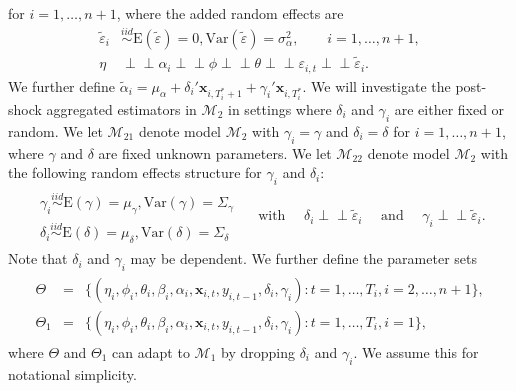 \documentclass[11pt]{article}
\def\mbf#1{\mathbf{#1}} %
\newcommand{\simiid}{\stackrel{iid}{\sim}} %
\newcommand{\indep}{\perp \!\!\! \perp } %
\def\mrm#1{\mathrm{#1}} %
\def\t#1{\tilde{#1}} %
\def\mc#1{\mathcal{#1}} %
\def\E#1{\mathrm{E}(#1)} %
\def\var#1{\mathrm{Var}(#1)} %
\theoremstyle{definition}
\begin{document}
for $i = 1, \ldots, n+1$, where the added random effects are
\begin{align*}
\t{\varepsilon}_{i} &\simiid  \E{\t{\varepsilon}}=0, \var{\t{\varepsilon}}=\sigma^2_{\alpha}, \qquad i = 1, \ldots, n+1,\\
\eta &\indep  \alpha_i \indep \phi \indep \theta \indep \varepsilon_{i,t} \indep \t{\varepsilon}_{i}.
\end{align*}
We further define 
$\tilde{\alpha}_i=\mu_{\alpha}+\delta_i'\mbf{x}_{i, T_i^*+1}+\gamma_i'\mbf{x}_{i, T_i^*}$. 
We will investigate the post-shock aggregated estimators in $\mc{M}_2$ 
in settings where $\delta_i$ and $\gamma_i$ are either fixed or random. 
We let $\mc{M}_{21}$ denote model $\mc{M}_{2}$ with $\gamma_i = \gamma$ 
and $\delta_i = \delta$ for $i= 1, \ldots, n+1$, 
where $\gamma$ and $\delta$ are fixed unknown parameters.
We let $\mc{M}_{22}$ denote model $\mc{M}_{2}$ with the following random effects 
structure for $\gamma_i$ and $\delta_i$:
\begin{align*}
\begin{array}{c}
  \gamma_i \overset{iid}{\sim} \mrm{E}(\gamma) = \mu_\gamma, \var{\gamma} = \Sigma_\gamma \\
  \delta_i \overset{iid}{\sim} \mrm{E}(\delta) = \mu_\delta, \var{\delta} = \Sigma_\delta
\end{array}
   \quad \text{ with } \quad  \delta_i  \indep \t{\varepsilon}_{i} \quad  \text{ and } \quad \gamma_i  \indep \t{\varepsilon}_{i}.
\end{align*}
Note that $\delta_i$ and $\gamma_i$ may be dependent. We further define the parameter sets
\begin{align}
  \begin{array}{lll}
     \Theta &= &\{(\eta_i, \phi_i, \theta_i, \beta_i, \alpha_i, \mbf{x}_{i,t}, y_{i,t-1}, \delta_i, \gamma_i)\colon t= 1, \ldots, T_i, i = 2, \ldots, n +1\},\\
    \Theta_1 &= &\{(\eta_i, \phi_i, \theta_i, \beta_i, \alpha_i, \mbf{x}_{i,t}, y_{i,t-1}, \delta_i, \gamma_i)\colon t= 1, \ldots, T_i, i = 1\},\label{parameter}
  \end{array}
\end{align}
where $\Theta$ and $\Theta_1$ can adapt to $\mc{M}_1$ by dropping $\delta_i$ and 
$\gamma_i$. We assume this for notational simplicity.
\end{document}
